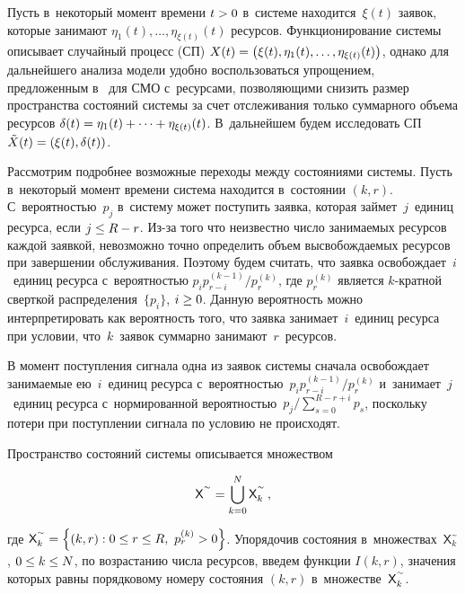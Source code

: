 \begin{multicols}{2}
  Пусть в~некоторый момент времени $t\hm>0$ в~сис\-те\-ме находится~$\xi(t)$ 
заявок, которые занимают $\eta_1(t),\ldots ,\eta_{\xi(t)}(t)$ ресурсов. 
Функционирование сис\-те\-мы описывает случайный процесс (СП) $X(t)\hm=\left( 
\xi(t), \eta_1(t),\ldots , \eta_{\xi(t)}(t)\right)$, однако для дальнейшего анализа 
модели удобно воспользоваться упрощением, предложенным в~\cite{10-sop} 
для СМО с~ресурсами, позволяющими снизить размер простран\-ства 
состояний системы за счет отслеживания только суммарного объема 
ресурсов $\delta(t)\hm= \eta_1(t)+\cdots+\eta_{\xi(t)}(t)$. В~дальнейшем будем 
исследовать СП $\tilde{X}(t)\hm= \left( \xi(t),\delta(t)\right)$. 
  
  Рассмотрим подробнее возможные переходы между состояниями системы. 
Пусть в~некоторый момент времени система находится в~состоянии $(k,r)$. 
С~вероятностью~$p_j$ в~систему может поступить заявка, которая 
займет~$j$~единиц ресурса, если $j\hm\leq R\hm-r$. Из-за того что 
неизвестно число занимаемых ресурсов каждой заявкой, невозможно точно 
определить объем высвобождаемых ресурсов при завершении обслуживания. 
Поэтому будем считать, что заявка освобождает~$i$~единиц ресурса 
с~вероятностью $p_ip_{r-i}^{(k-1)}/p_r^{(k)}$, где $p_r^{(k)}$ является  
$k$-крат\-ной сверткой распределения~$\{p_i\}$, $i\hm\geq0$. Данную 
вероятность можно интерпретировать как вероятность того, что заявка 
занимает~$i$~единиц ресурса при условии, что~$k$~заявок суммарно 
занимают~$r$~ресурсов. 
  
  В момент поступления сигнала одна из заявок системы сначала 
освобождает занимаемые ею~$i$~единиц ресурса с~вероятностью~$p_i p_{r-
i}^{(k-1)}/p_r^{(k)}$ и~занимает~$j$~единиц ресурса с~нормированной 
вероят\-ностью~$p_j/\sum\nolimits_{s=0}^{R-r+i} p_s$, поскольку потери при 
поступле\-нии сигнала по условию не происходят.
  
  Пространство состояний системы описывается множеством
  
  \noindent
   $$
    \mathsf{X}^{\sptilde} \hm= \mathop{\bigcup}\limits_{k=0}^N 
   {\sf X}_k^{\sptilde}\,,
   $$
   
   \vspace*{-2pt}
   
   \noindent
    где ${\mathsf X}_k^{\sptilde} \hm= \left\{ 
(k,r): 0\hm\leq r\hm\leq R,\ p_r^{(k)}\hm>0\right\}$. Упорядочив состояния 
в~множествах~${\mathsf X}_k^{\sptilde}$, $0\hm\leq k\hm\leq N$, по возрастанию числа 
ресурсов, введем функции $I(k,r)$, значения которых равны порядковому 
номеру состояния $(k,r)$ в~множестве~${\sf X}_k^{\sptilde}$.
  

\end{multicols}
